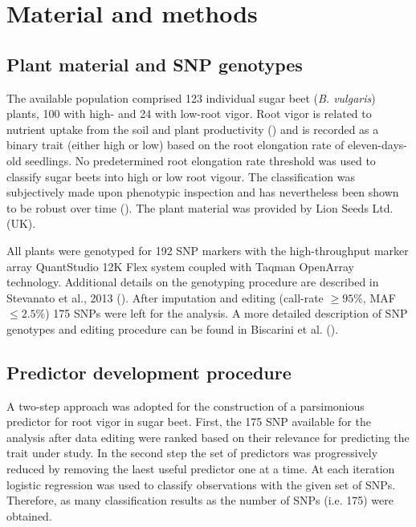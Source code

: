 \section{Material and methods}

\subsection{Plant material and SNP genotypes}
\label{sec:data}
The available population comprised 123 individual sugar beet (\emph{B. vulgaris})
plants, 100 with high- and 24 with low-root vigor. Root vigor is related
to nutrient uptake from the soil and plant productivity
(\cite{stevanato2010root}) and is recorded as a binary trait (either
high or low) based on the root elongation
rate of eleven-days-old seedlings. No predetermined root
elongation rate threshold was used to classify sugar beets into high or low
root vigour. The classification was subjectively made upon phenotypic
inspection and has nevertheless been shown to be robust over time (\cite{stevanato2010root}). 
The plant material was provided by Lion Seeds Ltd. (UK).

All plants were genotyped for 192 SNP markers with the
high-throughput marker array QuantStudio 12K Flex system
coupled with Taqman OpenArray technology. Additional details on the
genotyping procedure are described in Stevanato et al., 2013 (\cite{stevanato2013high}).
After imputation and editing (call-rate $\geq 95\%$, MAF $\leq 2.5\%$)
175 SNPs were left for the analysis. A more detailed description of SNP
genotypes and editing procedure can be found in Biscarini et al. (\cite{biscarini2014genome}).

\subsection{Predictor development procedure}
\label{sec:overview}
A two-step approach was adopted for the construction of a parsimonious
predictor for root vigor in sugar beet.
First, the 175 SNP available for the analysis after data editing were ranked based on their
relevance for predicting the trait under study.
In the second step the set of predictors was progressively reduced by
removing the laest useful predictor one at a time. At each iteration
logistic regression was used to classify observations with the given set
of SNPs. 
Therefore, as many classification results as the number of SNPs (i.e. 175) were obtained.

